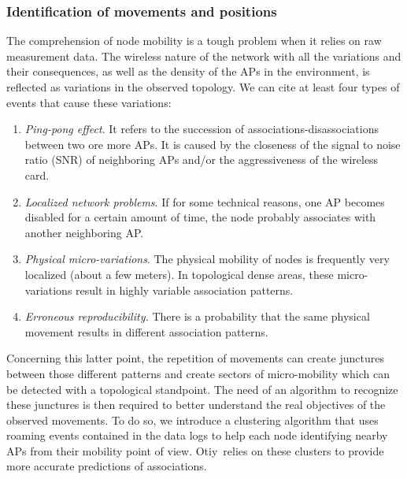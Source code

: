 \documentclass[a4paper]{sig-alternate-10pt}
\newcommand{\otiy}{{\sffamily Otiy}}
\begin{document}
\subsubsection{Identification of movements and positions}
\label{sec:understanding}

The comprehension of node mobility is a tough problem when it
relies on raw measurement data. The wireless nature of the network
with all the variations and their consequences, as well as the
density of the APs in the environment, is reflected as variations in
the observed topology. We can cite at least four types of events
that cause these variations:

\begin{enumerate}

\item {\it Ping-pong effect}. It refers to the
succession of as\-sociations-disas\-sociations between two ore more
APs. It is caused by the closeness of the signal to noise ratio
(SNR) of neighboring APs and/or the aggressiveness of the wireless
card.

\item {\it Localized network problems}. If for
some technical reasons, one AP becomes disabled for a certain amount
of time, the node probably associates with another neighboring
AP.

\item {\it Physical micro-variations}. The physical mobility of
nodes is frequently very localized (about a few meters). In
topological dense areas, these micro-variations result in highly
variable association patterns.

\item {\it Erroneous reproducibility.} There is
a probability that the same physical movement results in different
association patterns.

\end{enumerate}

Concerning this latter point, the repetition of movements can create
junctures between those different patterns and create sectors of
micro-mobility which can be detected with a topological standpoint.
The need of an algorithm to recognize these junctures is then
required to better understand the real objectives of the observed
movements. To do so, we introduce a clustering algorithm that uses
roaming events contained in the data logs to help each node
identifying nearby APs from their mobility point of view. \otiy\
relies on these clusters to provide more accurate predictions of
associations.
\end{document}
